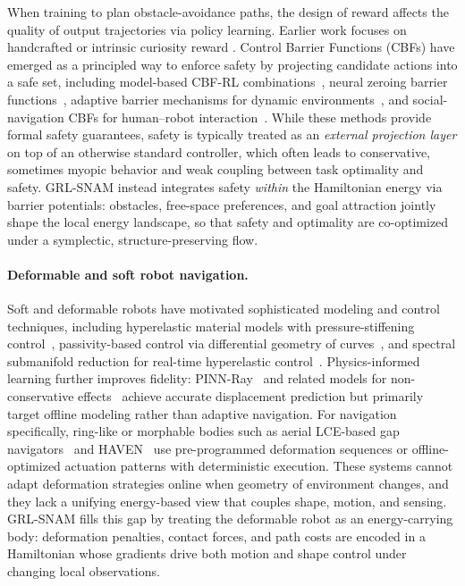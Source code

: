 \documentclass{article} %
\begin{document}
When training to plan obstacle-avoidance paths, the design of reward affects the quality of output trajectories via policy learning. Earlier work focuses on handcrafted or intrinsic curiosity reward \citep{tai2017virtual, Lei2018curiosity}. Control Barrier Functions (CBFs) have emerged as a principled way to enforce safety by projecting candidate actions into a safe set, including model-based CBF-RL combinations~\citep{li2023imagination}, neural zeroing barrier functions~\citep{feng2023safer}, adaptive barrier mechanisms for dynamic environments~\citep{sac2025barrier}, and social-navigation CBFs for human--robot interaction~\citep{social2024barrier}. While these methods provide formal safety guarantees, safety is typically treated as an \emph{external projection layer} on top of an otherwise standard controller, which often leads to conservative, sometimes myopic behavior and weak coupling between task optimality and safety. GRL-SNAM instead integrates safety \emph{within} the Hamiltonian energy via barrier potentials: obstacles, free-space preferences, and goal attraction jointly shape the local energy landscape, so that safety and optimality are co-optimized under a symplectic, structure-preserving flow.

\paragraph{Deformable and soft robot navigation.}
Soft and deformable robots have motivated sophisticated modeling and control techniques, including hyperelastic material models with pressure-stiffening control~\citep{roshanfar2023hyperelastic}, passivity-based control via differential geometry of curves~\citep{caasenbrood2022control}, and spectral submanifold reduction for real-time hyperelastic control~\citep{nature2025discovering}. Physics-informed learning further improves fidelity: PINN-Ray~\citep{wang2024pinn} and related models for non-conservative effects~\citep{liu2024physics} achieve accurate displacement prediction but primarily target offline modeling rather than adaptive navigation. For navigation specifically, ring-like or morphable bodies such as aerial LCE-based gap navigators~\citep{qi2024aerial} and HAVEN~\citep{haven2024haptic} use pre-programmed deformation sequences or offline-optimized actuation patterns with deterministic execution. These systems cannot adapt deformation strategies online when geometry of environment changes, and they lack a unifying energy-based view that couples shape, motion, and sensing. GRL-SNAM fills this gap by treating the deformable robot as an energy-carrying body: deformation penalties, contact forces, and path costs are encoded in a Hamiltonian whose gradients drive both motion and shape control under changing local observations.
\end{document}
